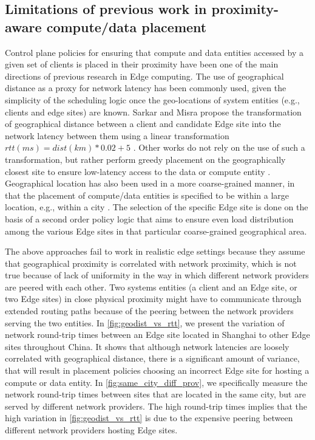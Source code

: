 \subsection{Limitations of previous work in proximity-aware compute/data placement}
\label{sec:nw_prox_prev_work}
Control plane policies for ensuring that compute and data entities accessed by a given set of clients is placed in their proximity have been one of the main directions of previous research in Edge computing. The use of geographical distance as a proxy for network latency has been commonly used, given the simplicity of the scheduling logic once the geo-locations of system entities (e.g., clients and edge sites) are known. Sarkar and Misra \cite{sarkar2016theoretical} propose the transformation of geographical distance between a client and candidate Edge site into the network latency between them using a linear transformation $rtt\left(ms\right) = dist \left(km\right) * 0.02 + 5$ \cite{qureshi2010power}. Other works do not rely on the use of such a transformation, but rather perform greedy placement on the geographically closest site to ensure low-latency access to the data or compute entity \cite{lahderanta2021edge}. Geographical location has also been used in a more coarse-grained manner, in that the placement of compute/data entities is specified to be within a large location, e.g., within a city \cite{vilaccageolocate}. The selection of the specific Edge site is done on the basis of a second order policy logic that aims to ensure even load distribution among the various Edge sites in that particular coarse-grained geographical area. 
\par The above approaches fail to work in realistic edge settings because they assume that geographical proximity is correlated with network proximity, which is not true because of lack of uniformity in the way in which different network providers are peered with each other. Two systems entities (a client and an Edge site, or two Edge sites) in close physical proximity might have to communicate through extended routing paths because of the peering between the network providers serving the two entities. In \cref{fig:geodist_vs_rtt}, we present the variation of network round-trip times between an Edge site located in Shanghai to other Edge sites throughout China. It shows that although network latencies are loosely correlated with geographical distance, there is a significant amount of variance, that will result in placement policies choosing an incorrect Edge site for hosting a compute or data entity. In \cref{fig:same_city_diff_prov}, we specifically measure the network round-trip times between sites that are located in the same city, but are served by different network providers. The high round-trip times implies that the high variation in \cref{fig:geodist_vs_rtt} is due to the expensive peering between different network providers hosting Edge sites. 
